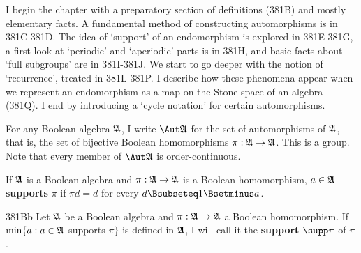 
\def\End{\mathop{\text{End}}}
\def\cycleii#1#2#3{\cycle{#1\,_{#2}\,#3}}

\def\chaptername{Automorphisms}
\def\sectionname{Automorphisms of Boolean algebras}


I begin the chapter with a preparatory section of definitions (381B) and
mostly elementary facts.   A fundamental method of constructing
automorphisms is in 381C-381D.   The idea of `support' of an
endomorphism is explored in  381E-381G,   %
a first look at `periodic' and `aperiodic' parts is in 381H, and basic
facts about `full subgroups' are in 381I-381J.   We start to go deeper
with the notion of `recurrence', treated in
381L-381P.  %
I describe how these phenomena appear when we represent an endomorphism
as a map on the Stone space of an algebra (381Q).   I end by introducing
a `cycle notation' for certain automorphisms.

 For any Boolean algebra
$\frak A$, I write $\Aut\frak A$ for the set of automorphisms of
$\frak A$, that is, the set of bijective Boolean homomorphisms
$\pi:\frak A\to\frak A$.   This is a group.   Note that
every member
of $\Aut\frak A$ is order-continuous.

If $\frak A$ is a Boolean algebra and
$\pi:\frak A\to\frak A$ is a Boolean homomorphism, 
$a\in\frak A$ {\bf supports} $\pi$ if $\pi d=d$ for every
$d\Bsubseteq 1\Bsetminus a$.

\spheader 381Bb Let $\frak A$ be a Boolean algebra and
$\pi:\frak A\to\frak A$ a Boolean homomorphism.   If
$\min\{a:a\in\frak A$ supports $\pi\}$ is
defined in $\frak A$, I will call it the {\bf support} $\supp\pi$ of
$\pi$.

